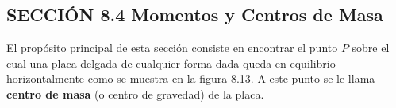 \vspace{0.8cm}
\subsection*{SECCIÓN 8.4 \quad Momentos y Centros de Masa}

El propósito principal de esta sección consiste en encontrar el punto $P$ sobre el cual una placa delgada de cualquier forma dada queda en equilibrio horizontalmente como se muestra en la figura 8.13. A este punto se le llama \textbf{centro de masa} (o centro de gravedad) de la placa.
